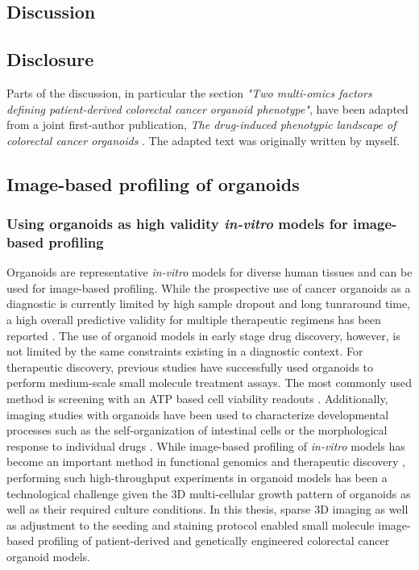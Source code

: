 \begin{flushleft}

\chapter{Discussion}

\section{Disclosure}
Parts of the discussion, in particular the section \textit{"Two multi-omics factors defining patient-derived colorectal cancer organoid phenotype"}, have been adapted from a joint first-author publication, \textit{The drug-induced phenotypic landscape of colorectal cancer organoids} \parencite{betgeDruginducedPhenotypicLandscape2022}. The adapted text was originally written by myself.


\section{Image-based profiling of organoids}

\subsection{Using organoids as high validity \textit{in-vitro} models for image-based profiling}

Organoids are representative \textit{in-vitro} models for diverse human tissues and can be used for image-based profiling. While the prospective use of cancer organoids as a diagnostic is currently limited by high sample dropout and long tunraround time, a high overall predictive validity for multiple therapeutic regimens has been reported \parencite{ooftProspectiveExperimentalTreatment2021}. The use of organoid models in early stage drug discovery, however, is not limited by the same constraints existing in a diagnostic context. For therapeutic discovery, previous studies have successfully used organoids to perform medium-scale small molecule treatment assays. The most commonly used method is screening with an ATP based cell viability readouts \parencite{vandeweteringProspectiveDerivationLiving2015}. Additionally, imaging studies with organoids have been used to characterize developmental processes such as the self-organization of intestinal cells \parencite{lukoninPhenotypicLandscapeIntestinal2020, boehnkeAssayEstablishmentValidation2016a} or the morphological response to individual drugs \parencite{Badder2020-au, serraSelforganizationSymmetryBreaking2019}. While image-based profiling of \textit{in-vitro} models has become an important method in functional genomics and therapeutic discovery \parencite{carpenterImagebasedChemicalScreening2007}, performing such high-throughput experiments in organoid models has been a technological challenge given the 3D multi-cellular growth pattern of organoids as well as their required culture conditions. In this thesis, sparse 3D imaging as well as adjustment to the seeding and staining protocol enabled small molecule image-based profiling of patient-derived and genetically engineered colorectal cancer organoid models. 
\bigbreak



\end{flushleft}
